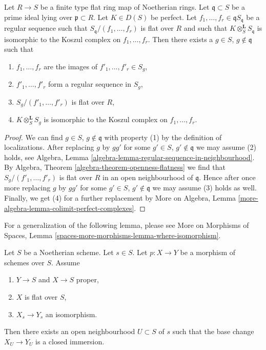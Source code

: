 \begin{lemma}
\label{lemma-limit-arguments}
Let $R \to S$ be a finite type flat ring map of Noetherian rings.
Let $\mathfrak q \subset S$ be a prime ideal lying over
$\mathfrak p \subset R$. Let $K \in D(S)$ be perfect.
Let $f_1, \ldots, f_r \in \mathfrak q S_\mathfrak q$
be a regular sequence such that $S_\mathfrak q/(f_1, \ldots, f_r)$
is flat over $R$ and such that
$K \otimes_S^\mathbf{L} S_\mathfrak q$ is isomorphic to the
Koszul complex on $f_1, \ldots, f_r$. Then there exists a
$g \in S$, $g \not \in \mathfrak q$ such that
\begin{enumerate}
\item $f_1, \ldots, f_r$ are the images of
$f'_1, \ldots, f'_r \in S_g$,
\item $f'_1, \ldots, f'_r$ form a regular sequence in $S_g$,
\item $S_g/(f'_1, \ldots, f'_r)$ is flat over $R$,
\item $K \otimes_S^\mathbf{L} S_g$ is isomorphic to the
Koszul complex on $f_1, \ldots, f_r$.
\end{enumerate}
\end{lemma}

\begin{proof}
We can find $g \in S$, $g \not \in \mathfrak q$ with property (1) by
the definition of localizations. After replacing $g$ by
$gg'$ for some $g' \in S$, $g' \not \in \mathfrak q$
we may assume (2) holds, see
Algebra, Lemma \ref{algebra-lemma-regular-sequence-in-neighbourhood}.
By Algebra, Theorem \ref{algebra-theorem-openness-flatness}
we find that $S_g/(f'_1, \ldots, f'_r)$ is flat over $R$
in an open neighbourhood of $\mathfrak q$.
Hence after once more replacing $g$ by $gg'$ for some
$g' \in S$, $g' \not \in \mathfrak q$ we may assume (3) holds as well.
Finally, we get (4) for a further replacement by
More on Algebra, Lemma \ref{more-algebra-lemma-colimit-perfect-complexes}.
\end{proof}

\noindent
For a generalization of the following lemma, please see
More on Morphisms of Spaces, Lemma
\ref{spaces-more-morphisms-lemma-where-isomorphism}.

\begin{lemma}
\label{lemma-isomorphism-in-neighbourhood}
Let $S$ be a Noetherian scheme. Let $s \in S$.
Let $p : X \to Y$ be a morphism of schemes over $S$.
Assume
\begin{enumerate}
\item $Y \to S$ and $X \to S$ proper,
\item $X$ is flat over $S$,
\item $X_s \to Y_s$ an isomorphism.
\end{enumerate}
Then there exists an open neighbourhood $U \subset S$ of $s$
such that the base change $X_U \to Y_U$ is a closed immersion.
\end{lemma}

